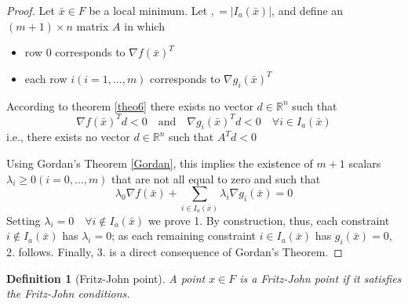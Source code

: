 \documentclass{book}
\newcommand{\R}{\mathbb{R}}
\theoremstyle{theoremv2}
\theoremstyle{defv2}
\newtheorem{definition}{Definition}[chapter]
\theoremstyle{remark}
\theoremstyle{remark}
\begin{document}
\begin{proof}
    Let $\bar{x}\in F$ be a local minimum. Let $,=|I_a(\bar{x})|$, and define an $(m+1)\times n$ matrix $A$ in which 
    \begin{itemize}
        \item row 0 corresponds to $\nabla f(\bar{x})^T$
        \item each row $i (i=1,\dots,m)$ corresponds to $\nabla g_i(\bar{x})^T$
    \end{itemize}
    According to theorem \ref{theo6} there exists no vector $d\in\R^n$ such that 
    \[
        \nabla f(\bar{x})^Td<0 \quad \text{and} \quad \nabla g_i(\bar{x})^Td<0 \quad \forall i\in I_a(\bar{x})
    \]
    i.e., there exists no vector $d\in\R^n$ such that $A^Td<0$ 

    Using Gordan's Theorem \ref{Gordan}, this implies the existence of $m+1$ scalars $\lambda_i\geq0(i=0,\dots,m)$ that are not all equal to zero and such that 
    \[
        \lambda_0\nabla f(\bar{x}) + \displaystyle\sum_{i\in I_a(\bar{x})} \lambda_i \nabla g_i(\bar{x})=0
    \]
    Setting $\lambda_i=0 \quad \forall i\notin I_a(\bar{x})$ we prove 1. By construction, thus, each constraint $i\notin I_a(\bar{x})$ has $\lambda_i=0$; as each remaining constraint $i\in I_a(\bar{x})$ has $g_i(\bar{x})=0$, 2. follows. Finally, 3. is a direct consequence of Gordan's Theorem.
\end{proof}
\begin{definition}[Fritz-John point]
    A point $x\in F$ is a Fritz-John point if it satisfies the Fritz-John conditions.
\end{definition}
\end{document}

